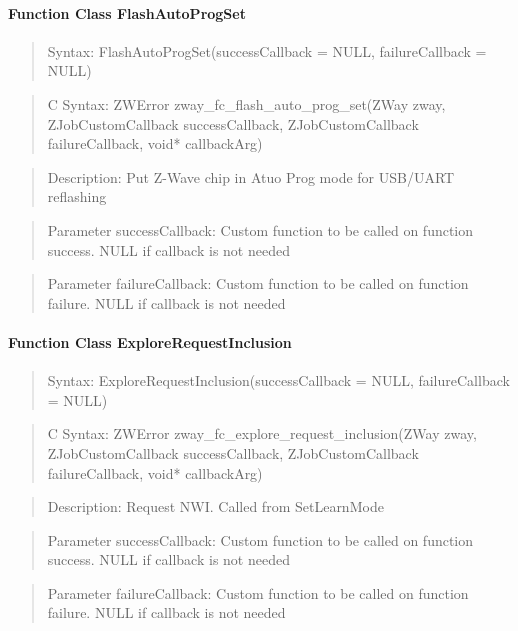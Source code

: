 \paragraph{Function Class FlashAutoProgSet}
\begin{quote}Syntax: FlashAutoProgSet(successCallback = NULL, failureCallback = NULL)\end{quote}
\begin{quote}C Syntax: ZWError zway\_fc\_flash\_auto\_prog\_set(ZWay zway, ZJobCustomCallback successCallback, ZJobCustomCallback failureCallback, void* callbackArg)\end{quote}
\begin{quote}Description: Put Z-Wave chip in Atuo Prog mode for USB/UART reflashing\end{quote}
\begin{quote}Parameter successCallback: Custom function to be called on function success. NULL if callback is not needed\end{quote}
\begin{quote}Parameter failureCallback: Custom function to be called on function failure. NULL if callback is not needed\end{quote}


\paragraph{Function Class ExploreRequestInclusion}
\begin{quote}Syntax: ExploreRequestInclusion(successCallback = NULL, failureCallback = NULL)\end{quote}
\begin{quote}C Syntax: ZWError zway\_fc\_explore\_request\_inclusion(ZWay zway, ZJobCustomCallback successCallback, ZJobCustomCallback failureCallback, void* callbackArg)\end{quote}
\begin{quote}Description: Request NWI. Called from SetLearnMode\end{quote}
\begin{quote}Parameter successCallback: Custom function to be called on function success. NULL if callback is not needed\end{quote}
\begin{quote}Parameter failureCallback: Custom function to be called on function failure. NULL if callback is not needed\end{quote}


